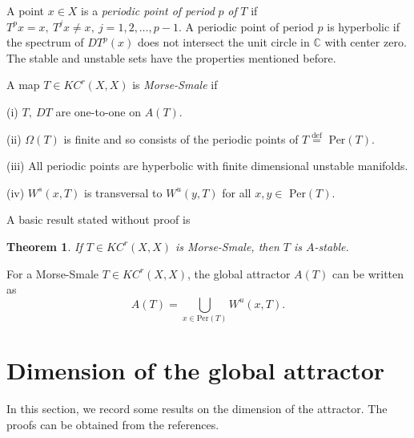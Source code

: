 \documentclass{surv-l}
\theoremstyle{plain}
\newtheorem{theorem}{Theorem}[section]
\theoremstyle{definition}
\numberwithin{equation}{section}
\numberwithin{figure}{chapter}
\begin{document}
A point $x\in X$ is a \emph{periodic point of period} $p$ \emph{of} $T$ if $T^{p}x=x,\ T^{j}x\neq x,\ j=1,2,\ldots, p-1$. A periodic point of period $p$ is hyperbolic if the spectrum of $DT^{p}(x)$ does not intersect the unit circle in $\mathbb{C}$ with center zero. The stable and unstable sets have the properties mentioned before.

A map $T\in KC^{r}(X, X)$ is \emph{Morse-Smale} if

(i) $T,\ DT$ are one-to-one on $A(T)$.

(ii) $\Omega(T)$ is finite and so consists of the periodic points of $T \overset{\mathrm{def}}=$ Per$(T)$.

(iii) All periodic points are hyperbolic with finite dimensional unstable manifolds.

(iv) $W^{s}(x, T)$ is transversal to $W^{u}(y, T)$ for all $x, y\in$ Per$(T)$.

A basic result stated without proof is

\begin{theorem}\label{thm2.7.1} If $T\in KC^{r}(X, X)$ is Morse-Smale, then $T$ is $A$-stable.
\end{theorem}

For a Morse-Smale $T\in KC^{r}(X, X)$, the global attractor $A(T)$ can be written as
\begin{equation*}
A(T)=\bigcup_{x\in \mathrm{Per} (T)}W^{u}(x, T).
\end{equation*}

\section{Dimension of the global attractor}\label{sec2.8}

In this section, we record some results on the dimension of the attractor. The proofs can be obtained from the references.
\end{document}
